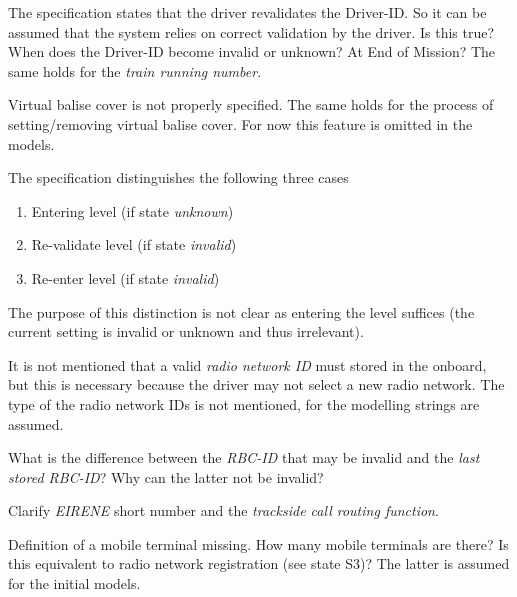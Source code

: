 \documentclass{template/openetcs_article}
\begin{document}
The specification states that the driver revalidates the Driver-ID. So it can be assumed that the system relies on correct validation by the driver. Is this true? When does the Driver-ID become invalid or unknown? At End of Mission? The same holds for the \emph{train running number}.

Virtual balise cover is not properly specified. The same holds for the process of setting/removing virtual balise cover. For now this feature is omitted in the models.

The specification distinguishes the following three cases
\begin{enumerate}
   \item Entering level (if state \emph{unknown})
   \item Re-validate level (if state \emph{invalid})
   \item Re-enter level (if state \emph{invalid})
\end{enumerate}
The purpose of this distinction is not clear as entering the level suffices (the current setting is invalid or unknown and thus irrelevant).

It is not mentioned that a valid \emph{radio network ID} must stored in the onboard, but this is necessary because the driver may not select a new radio network. The type of the radio network IDs is not mentioned, for the modelling strings are assumed.

What is the difference between the \emph{RBC-ID} that may be invalid and the \emph{last stored RBC-ID}? Why can the latter not be invalid?

Clarify \emph{EIRENE} short number and the \emph{trackside call routing function}.

Definition of a mobile terminal missing. How many mobile terminals are there? Is this equivalent to radio network registration (see state S3)? The latter is assumed for the initial models.







\begin{thebibliography}{9}


\end{thebibliography}

\end{document}
